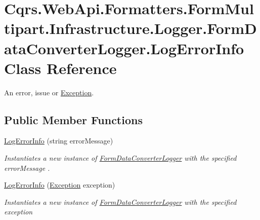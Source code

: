 \hypertarget{classCqrs_1_1WebApi_1_1Formatters_1_1FormMultipart_1_1Infrastructure_1_1Logger_1_1FormDataConverterLogger_1_1LogErrorInfo}{}\section{Cqrs.\+Web\+Api.\+Formatters.\+Form\+Multipart.\+Infrastructure.\+Logger.\+Form\+Data\+Converter\+Logger.\+Log\+Error\+Info Class Reference}
\label{classCqrs_1_1WebApi_1_1Formatters_1_1FormMultipart_1_1Infrastructure_1_1Logger_1_1FormDataConverterLogger_1_1LogErrorInfo}


An error, issue or \hyperlink{classCqrs_1_1WebApi_1_1Formatters_1_1FormMultipart_1_1Infrastructure_1_1Logger_1_1FormDataConverterLogger_1_1LogErrorInfo_aca090100f80122a6a5ae5aa930f49e9b_aca090100f80122a6a5ae5aa930f49e9b}{Exception}.  


\subsection*{Public Member Functions}
\begin{DoxyCompactItemize}
\item 
\hyperlink{classCqrs_1_1WebApi_1_1Formatters_1_1FormMultipart_1_1Infrastructure_1_1Logger_1_1FormDataConverterLogger_1_1LogErrorInfo_a31916a55289297f7efaa60610ae7c709_a31916a55289297f7efaa60610ae7c709}{Log\+Error\+Info} (string error\+Message)
\begin{DoxyCompactList}\small\item\em Instantiates a new instance of \hyperlink{classCqrs_1_1WebApi_1_1Formatters_1_1FormMultipart_1_1Infrastructure_1_1Logger_1_1FormDataConverterLogger}{Form\+Data\+Converter\+Logger} with the specified {\itshape error\+Message} . \end{DoxyCompactList}\item 
\hyperlink{classCqrs_1_1WebApi_1_1Formatters_1_1FormMultipart_1_1Infrastructure_1_1Logger_1_1FormDataConverterLogger_1_1LogErrorInfo_a33f68203e91f1553c46ba09a41341714_a33f68203e91f1553c46ba09a41341714}{Log\+Error\+Info} (\hyperlink{classCqrs_1_1WebApi_1_1Formatters_1_1FormMultipart_1_1Infrastructure_1_1Logger_1_1FormDataConverterLogger_1_1LogErrorInfo_aca090100f80122a6a5ae5aa930f49e9b_aca090100f80122a6a5ae5aa930f49e9b}{Exception} exception)
\begin{DoxyCompactList}\small\item\em Instantiates a new instance of \hyperlink{classCqrs_1_1WebApi_1_1Formatters_1_1FormMultipart_1_1Infrastructure_1_1Logger_1_1FormDataConverterLogger}{Form\+Data\+Converter\+Logger} with the specified {\itshape exception}  \end{DoxyCompactList}\end{DoxyCompactItemize}
